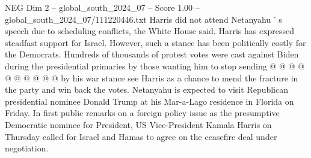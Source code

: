 \begin{textsample}{NEG Dim 2 – global\_south\_2024\_07 – Score 1.00 – global\_south\_2024\_07/111220446.txt}
Harris did not attend Netanyahu ' s speech due to scheduling conflicts, the White House said.
Harris has expressed steadfast support for Israel.
However, such a stance has been politically costly for the Democrats.
Hundreds of thousands of protest votes were cast against Biden during the presidential primaries by those wanting him to stop sending @ @ @ @ @ @ @ @ @ @ by his war stance see Harris as a chance to mend the fracture in the party and win back the votes.
Netanyahu is expected to visit Republican presidential nominee Donald Trump at his Mar-a-Lago residence in Florida on Friday.
In first public remarks on a foreign policy issue as the presumptive Democratic nominee for President, US Vice-President Kamala Harris on Thursday called for Israel and Hamas to agree on the ceasefire deal under negotiation.

\end{textsample}
